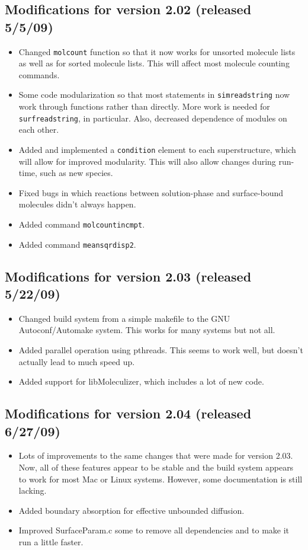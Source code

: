 \documentclass {scrbook}
\newcommand {\ttt} {\texttt}
\begin{document}
\subsection{Modifications for version 2.02 (released 5/5/09)}
\begin{itemize}
\item Changed \ttt{molcount} function so that it now works for unsorted molecule lists as well as for sorted molecule lists. This will affect most molecule counting commands.
\item Some code modularization so that most statements in \ttt{simreadstring} now work through functions rather than directly. More work is needed for \ttt{surfreadstring}, in particular. Also, decreased dependence of modules on each other.
\item Added and implemented a \ttt{condition} element to each superstructure, which will allow for improved modularity. This will also allow changes during run-time, such as new species.
\item Fixed bugs in which reactions between solution-phase and surface-bound molecules didn't always happen.
\item Added command \ttt{molcountincmpt}.
\item Added command \ttt{meansqrdisp2}.
\end{itemize}

\subsection{Modifications for version 2.03 (released 5/22/09)}
\begin{itemize}
\item Changed build system from a simple makefile to the GNU Autoconf/Automake system. This works for many systems but not all.
\item Added parallel operation using pthreads. This seems to work well, but doesn't actually lead to much speed up.
\item Added support for libMoleculizer, which includes a lot of new code.
\end{itemize}

\subsection{Modifications for version 2.04 (released 6/27/09)}
\begin{itemize}
\item Lots of improvements to the same changes that were made for version 2.03. Now, all of these features appear to be stable and the build system appears to work for most Mac or Linux systems. However, some documentation is still lacking.
\item Added boundary absorption for effective unbounded diffusion.
\item Improved SurfaceParam.c some to remove all dependencies and to make it run a little faster.
\end{itemize}
\end{document}

